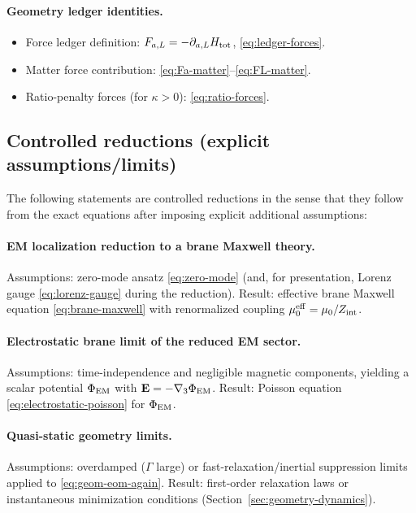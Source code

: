 \documentclass[11pt]{article}
\begin{document}
\paragraph{Geometry ledger identities.}
\begin{itemize}[leftmargin=2.0em]
\item Force ledger definition: $F_{a,L}=-\partial_{a,L}H_{\rm tot}$, \eqref{eq:ledger-forces}.
\item Matter force contribution: \eqref{eq:Fa-matter}--\eqref{eq:FL-matter}.
\item Ratio-penalty forces (for $\kappa>0$): \eqref{eq:ratio-forces}.
\end{itemize}

\subsection{Controlled reductions (explicit assumptions/limits)}
\label{app:claims-controlled}

The following statements are controlled reductions in the sense that they follow from the exact equations after imposing explicit additional assumptions:

\paragraph{EM localization reduction to a brane Maxwell theory.}
Assumptions: zero-mode ansatz \eqref{eq:zero-mode} (and, for presentation, Lorenz gauge \eqref{eq:lorenz-gauge} during the reduction). Result: effective brane Maxwell equation \eqref{eq:brane-maxwell} with renormalized coupling $\mu_0^{\rm eff}=\mu_0/Z_{\rm int}$.

\paragraph{Electrostatic brane limit of the reduced EM sector.}
Assumptions: time-independence and negligible magnetic components, yielding a scalar potential $\Phi_{\rm EM}$ with $\mathbf{E}=-\nabla_3\Phi_{\rm EM}$. Result: Poisson equation \eqref{eq:electrostatic-poisson} for $\Phi_{\rm EM}$.

\paragraph{Quasi-static geometry limits.}
Assumptions: overdamped ($\Gamma$ large) or fast-relaxation/inertial suppression limits applied to \eqref{eq:geom-eom-again}. Result: first-order relaxation laws or instantaneous minimization conditions (Section~\ref{sec:geometry-dynamics}).
\end{document}
